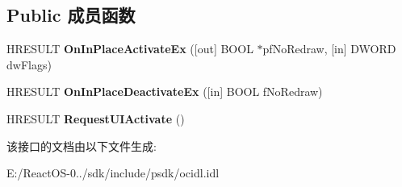 \subsection*{Public 成员函数}
\begin{DoxyCompactItemize}
\item 
\mbox{\label{interface_i_ole_in_place_site_ex_a7f0593a8db3728ece5c44bb61afbd92d}} 
H\+R\+E\+S\+U\+LT {\bfseries On\+In\+Place\+Activate\+Ex} (\mbox{[}out\mbox{]} B\+O\+OL $\ast$pf\+No\+Redraw, \mbox{[}in\mbox{]} D\+W\+O\+RD dw\+Flags)
\item 
\mbox{\label{interface_i_ole_in_place_site_ex_a2d0de839949f3a265125cdc01cc0e450}} 
H\+R\+E\+S\+U\+LT {\bfseries On\+In\+Place\+Deactivate\+Ex} (\mbox{[}in\mbox{]} B\+O\+OL f\+No\+Redraw)
\item 
\mbox{\label{interface_i_ole_in_place_site_ex_a84014fa5ac98d1090d18c2fdcea3a07e}} 
H\+R\+E\+S\+U\+LT {\bfseries Request\+U\+I\+Activate} ()
\end{DoxyCompactItemize}


该接口的文档由以下文件生成\+:\begin{DoxyCompactItemize}
\item 
E\+:/\+React\+O\+S-\/0../sdk/include/psdk/ocidl.\+idl\end{DoxyCompactItemize}
